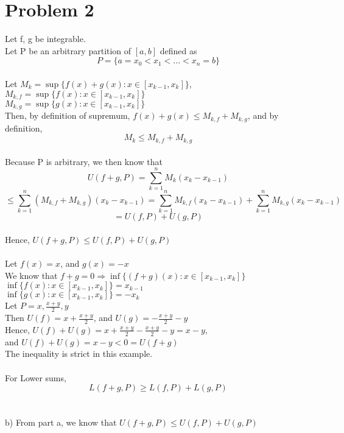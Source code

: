 \documentclass{article}
\begin{document}
\section*{Problem 2}
Let f, g be integrable.
\\Let P be an arbitrary partition of $[a, b]$ defined as $$P = \{a = x_0 < x_1 < ... < x_n = b\}$$
\\Let $M_k = \sup\{f(x)+g(x) : x \in [x_{k-1}, x_k]\}$,
\\$M_{k,f} = \sup\{f(x) : x \in [x_{k-1}, x_k]\}$
\\$M_{k,g} = \sup\{g(x) : x \in [x_{k-1}, x_k]\}$
\\Then, by definition of supremum, $f(x) + g(x) \leq M_{k,f} + M_{k, g}$, and by definition, $$M_k \leq M_{k,f} + M_{k, g}$$
\\Because P is arbitrary, we then know that $$U(f + g, P) = \sum_{k=1}^{n} M_k(x_k - x_{k-1})$$ $$\leq \sum_{k=1}^{n}(M_{k,f} + M_{k,g})(x_k - x_{k-1}) = \sum_{k=1}^n M_{k,f}(x_k - x_{k-1}) + \sum_{k=1}^n M_{k,g}(x_k - x_{k-1})$$
$$= U(f, P) + U(g, P)$$
\\Hence, $U(f + g, P) \leq U(f, P) + U(g, P)$
\\
\\Let $f(x) = x$, and $g(x) = -x$
\\We know that $f + g = 0 \Rightarrow \inf\{(f + g)(x) : x \in [x_{k-1}, x_k]\}$
\\$\inf\{f(x) : x \in [x_{k - 1}, x_k]\} = x_{k - 1}$
\\$\inf\{g(x) : x \in [x_{k - 1}, x_k]\} = -x_k$
\\Let $P = {x, \frac{x + y}{2}, y}$
\\Then $U(f) = x + \frac{x + y}{2}$, and $U(g) = -\frac{x + y}{2} - y$
\\Hence, $U(f) + U(g) = x + \frac{x + y}{2} -\frac{x+y}{2} - y = x - y$,
\\and $U(f) + U(g) = x - y < 0 = U(f + g)$
\\The inequality is strict in this example.
\\
\\For Lower sums, $$L(f + g, P) \geq L(f, P) + L(g, P)$$
\\
\\b) From part a, we know that $U(f + g, P) \leq U(f, P) + U(g, P)$
\end{document}
